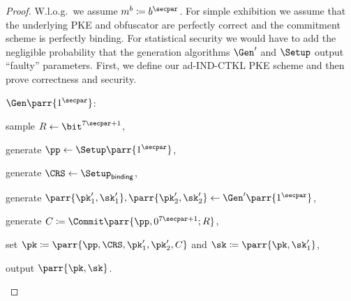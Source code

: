 \begin{proof}
    W.l.o.g.\ we assume \(m^b \coloneqq b^\secpar\).
    For simple exhibition we assume that the underlying PKE and obfuscator are perfectly correct and the commitment scheme is perfectly binding.
    For statistical security we would have to add the negligible probability that the generation algorithms \(\Gen'\) and \(\Setup\) output \enquote{faulty} parameters.
    First, we define our ad-IND-CTKL PKE scheme and then prove correctness and security.
    \begin{sitemize}
        \item \(\Gen\parr{1^\secpar}\):
        \begin{sitemize}
            \item sample \(R \gets \bit^{7\secpar+1}\),
            \item generate \(\pp \gets \Setup\parr{1^{\secpar}}\),
            \item generate \(\CRS \gets \Setup_{\textsf{binding}}\),
            \item generate \(\parr{\pk'_1,\sk'_1}, \parr{\pk'_2,\sk'_2} \gets \Gen'\parr{1^{\secpar}}\),
            \item generate \(C \coloneqq \Commit\parr{\pp,0^{7\secpar+1};R}\),
            \item set \(\pk \coloneqq \parr{\pp,\CRS,\pk'_1,\pk'_2,C}\) and \(\sk \coloneqq \parr{\pk,\sk'_1}\),
            \item output \(\parr{\pk,\sk}\).
        \end{sitemize}


\end{sitemize}
\end{proof}
